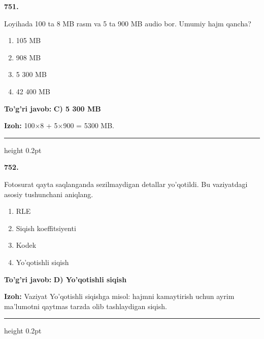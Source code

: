 \documentclass[10pt,a4paper,oneside]{article}
\begin{document}
\noindent\textbf{\color{ink}751.}
\par
Loyihada 100 ta 8 MB rasm va 5 ta 900 MB audio bor. Umumiy hajm qancha?
\begin{enumerate}[label=\Alph*),leftmargin=9mm]
\item 105 MB
\item 908 MB
\item 5 300 MB
\item 42 400 MB
\end{enumerate}
\begin{tcolorbox}[enhanced,breakable,colback=teal!4,colframe=teal!50!black,boxrule=0.5pt,arc=1.1mm,left=3mm,right=3mm,top=1.7mm,bottom=1.7mm,before skip=2mm,after skip=2mm]
\textbf{\color{teal}To'g'ri javob:} \textbf{C) 5 300 MB}
\par\smallskip
\textbf{Izoh:} 100\ensuremath{\times}8 + 5\ensuremath{\times}900 = 5300 MB.
\end{tcolorbox}
\vspace{2mm}\hrule height 0.2pt \vspace{3mm}

\noindent\textbf{\color{ink}752.}
\par
Fotosurat qayta saqlanganda sezilmaydigan detallar yo'qotildi. Bu vaziyatdagi asosiy tushunchani aniqlang.
\begin{enumerate}[label=\Alph*),leftmargin=9mm]
\item RLE
\item Siqish koeffitsiyenti
\item Kodek
\item Yo'qotishli siqish
\end{enumerate}
\begin{tcolorbox}[enhanced,breakable,colback=teal!4,colframe=teal!50!black,boxrule=0.5pt,arc=1.1mm,left=3mm,right=3mm,top=1.7mm,bottom=1.7mm,before skip=2mm,after skip=2mm]
\textbf{\color{teal}To'g'ri javob:} \textbf{D) Yo'qotishli siqish}
\par\smallskip
\textbf{Izoh:} Vaziyat Yo'qotishli siqishga misol: hajmni kamaytirish uchun ayrim ma'lumotni qaytmas tarzda olib tashlaydigan siqish.
\end{tcolorbox}
\vspace{2mm}\hrule height 0.2pt \vspace{3mm}
\end{document}
